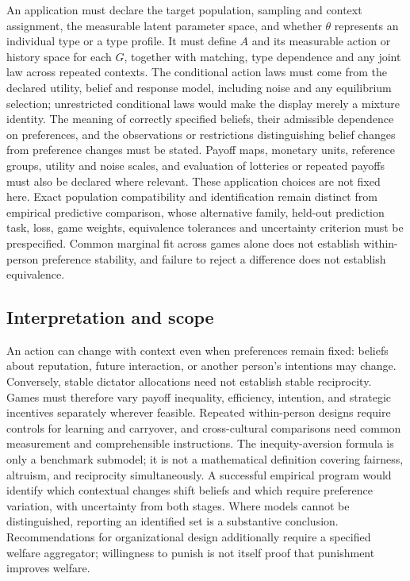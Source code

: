 \documentclass[11pt,a4paper]{article}
\begin{document}
An application must declare the target population, sampling and context assignment, the measurable latent parameter space, and whether $\theta$ represents an individual type or a type profile. It must define $A$ and its measurable action or history space for each $G$, together with matching, type dependence and any joint law across repeated contexts. The conditional action laws must come from the declared utility, belief and response model, including noise and any equilibrium selection; unrestricted conditional laws would make the display merely a mixture identity. The meaning of correctly specified beliefs, their admissible dependence on preferences, and the observations or restrictions distinguishing belief changes from preference changes must be stated. Payoff maps, monetary units, reference groups, utility and noise scales, and evaluation of lotteries or repeated payoffs must also be declared where relevant. These application choices are not fixed here. Exact population compatibility and identification remain distinct from empirical predictive comparison, whose alternative family, held-out prediction task, loss, game weights, equivalence tolerances and uncertainty criterion must be prespecified. Common marginal fit across games alone does not establish within-person preference stability, and failure to reject a difference does not establish equivalence.

\subsection*{Interpretation and scope}

An action can change with context even when preferences remain fixed: beliefs about reputation, future interaction, or another person's intentions may change. Conversely, stable dictator allocations need not establish stable reciprocity. Games must therefore vary payoff inequality, efficiency, intention, and strategic incentives separately wherever feasible. Repeated within-person designs require controls for learning and carryover, and cross-cultural comparisons need common measurement and comprehensible instructions. The inequity-aversion formula is only a benchmark submodel; it is not a mathematical definition covering fairness, altruism, and reciprocity simultaneously. A successful empirical program would identify which contextual changes shift beliefs and which require preference variation, with uncertainty from both stages. Where models cannot be distinguished, reporting an identified set is a substantive conclusion. Recommendations for organizational design additionally require a specified welfare aggregator; willingness to punish is not itself proof that punishment improves welfare.
\end{document}
